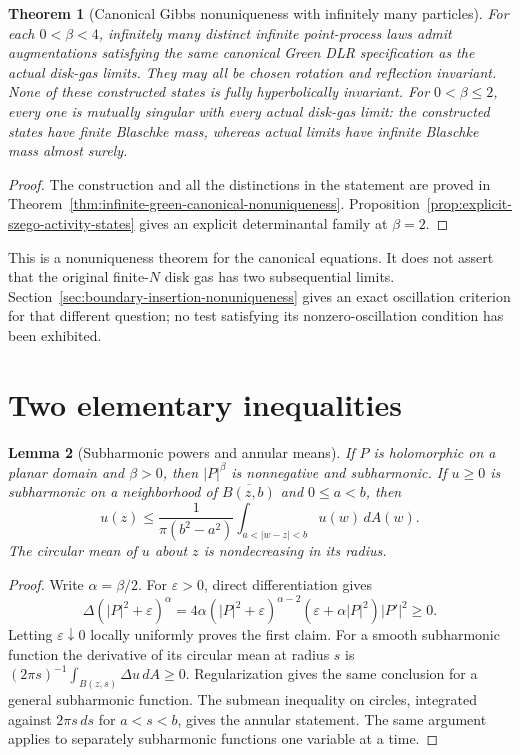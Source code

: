 \documentclass[11pt,a4paper]{article}
\numberwithin{equation}{section}
\newtheorem{theorem}{Theorem}[section]
\newtheorem{lemma}[theorem]{Lemma}
\theoremstyle{definition}
\theoremstyle{remark}
\begin{document}
\begin{theorem}[Canonical Gibbs nonuniqueness with infinitely many particles]
\label{thm:front-infinite-canonical-nonuniqueness}
For each $0<\beta<4$, infinitely many distinct infinite point-process
laws admit augmentations satisfying the same canonical Green DLR
specification as the actual disk-gas limits. They may all be chosen
rotation and reflection invariant. None of these constructed states
is fully hyperbolically invariant. For $0<\beta\le2$, every one is
mutually singular with every actual disk-gas limit: the constructed
states have finite Blaschke mass, whereas actual limits have infinite
Blaschke mass almost surely.
\end{theorem}
\begin{proof}
The construction and all the distinctions in the statement are proved
in Theorem~\ref{thm:infinite-green-canonical-nonuniqueness}.
Proposition~\ref{prop:explicit-szego-activity-states} gives an explicit
determinantal family at $\beta=2$.
\end{proof}

This is a nonuniqueness theorem for the canonical equations. It does
not assert that the original finite-$N$ disk gas has two subsequential
limits. Section~\ref{sec:boundary-insertion-nonuniqueness} gives an
exact oscillation criterion for that different question; no test
satisfying its nonzero-oscillation condition has been exhibited.

\section{Two elementary inequalities}
\begin{lemma}[Subharmonic powers and annular means]\label{lem:subharmonic}
If $P$ is holomorphic on a planar domain and $\beta>0$, then $|P|^\beta$
is nonnegative and subharmonic. If $u\ge0$ is subharmonic on a neighborhood
of $\overline{B(z,b)}$ and $0\le a<b$, then
\[
 u(z)\le\frac{1}{\pi(b^2-a^2)}
 \int_{a<|w-z|<b}u(w)\,dA(w).
\]
The circular mean of $u$ about $z$ is nondecreasing in its radius.
\end{lemma}
\begin{proof}
Write $\alpha=\beta/2$. For $\varepsilon>0$, direct differentiation gives
\[
 \Delta (|P|^2+\varepsilon)^\alpha
 =4\alpha(|P|^2+\varepsilon)^{\alpha-2}
       (\varepsilon+\alpha|P|^2)|P'|^2\ge0.
\]
Letting $\varepsilon\downarrow0$ locally uniformly proves the first claim.
For a smooth subharmonic function the derivative of its circular mean
at radius $s$ is $(2\pi s)^{-1}\int_{B(z,s)}\Delta u\,dA\ge0$.
Regularization gives the same conclusion for a general subharmonic function.
The submean inequality on circles, integrated against $2\pi s\,ds$ for
$a<s<b$, gives the annular statement. The same argument applies to
separately subharmonic functions one variable at a time.
\end{proof}
\end{document}
